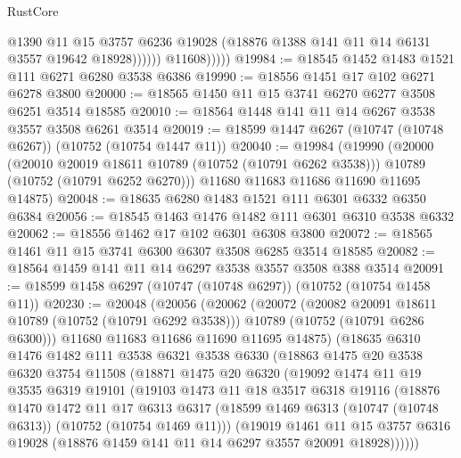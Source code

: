 \begin{lexlean}{RustCore}
\begin{coremodule}
                        @1390
                        @11
                        @15
                        @3757
                        @6236
                        @19028
                        (@18876 @1388 @141 @11 @14 @6131 @3557 @19642 @18928))))))
              @11608)))))
@19984 := @18545 @1452 @1483 @1521 @111 @6271 @6280 @3538 @6386
@19990 := @18556 @1451 @17 @102 @6271 @6278 @3800
@20000 := @18565 @1450 @11 @15 @3741 @6270 @6277 @3508 @6251 @3514 @18585
@20010 := @18564 @1448 @141 @11 @14 @6267 @3538 @3557 @3508 @6261 @3514
@20019 := @18599 @1447 @6267 (@10747 (@10748 @6267)) (@10752 (@10754 @1447 @11))
@20040 := @19984
    (@19990
      (@20000
        (@20010 @20019 @18611 @10789 (@10752 (@10791 @6262 @3538)))
        @10789
        (@10752 (@10791 @6252 @6270)))
      @11680
      @11683
      @11686
      @11690
      @11695
      @14875)
@20048 := @18635 @6280 @1483 @1521 @111 @6301 @6332 @6350 @6384
@20056 := @18545 @1463 @1476 @1482 @111 @6301 @6310 @3538 @6332
@20062 := @18556 @1462 @17 @102 @6301 @6308 @3800
@20072 := @18565 @1461 @11 @15 @3741 @6300 @6307 @3508 @6285 @3514 @18585
@20082 := @18564 @1459 @141 @11 @14 @6297 @3538 @3557 @3508 @388 @3514
@20091 := @18599 @1458 @6297 (@10747 (@10748 @6297)) (@10752 (@10754 @1458 @11))
@20230 := @20048
    (@20056
      (@20062
        (@20072
          (@20082 @20091 @18611 @10789 (@10752 (@10791 @6292 @3538)))
          @10789
          (@10752 (@10791 @6286 @6300)))
        @11680
        @11683
        @11686
        @11690
        @11695
        @14875)
      (@18635
        @6310
        @1476
        @1482
        @111
        @3538
        @6321
        @3538
        @6330
        (@18863
          @1475
          @20
          @3538
          @6320
          @3754
          @11508
          (@18871
            @1475
            @20
            @6320
            (@19092
              @1474
              @11
              @19
              @3535
              @6319
              @19101
              (@19103
                @1473
                @11
                @18
                @3517
                @6318
                @19116
                (@18876
                  @1470
                  @1472
                  @11
                  @17
                  @6313
                  @6317
                  (@18599 @1469 @6313 (@10747 (@10748 @6313)) (@10752 (@10754 @1469 @11)))
                  (@19019
                    @1461
                    @11
                    @15
                    @3757
                    @6316
                    @19028
                    (@18876 @1459 @141 @11 @14 @6297 @3557 @20091 @18928))))))

\end{coremodule}
\end{lexlean}
